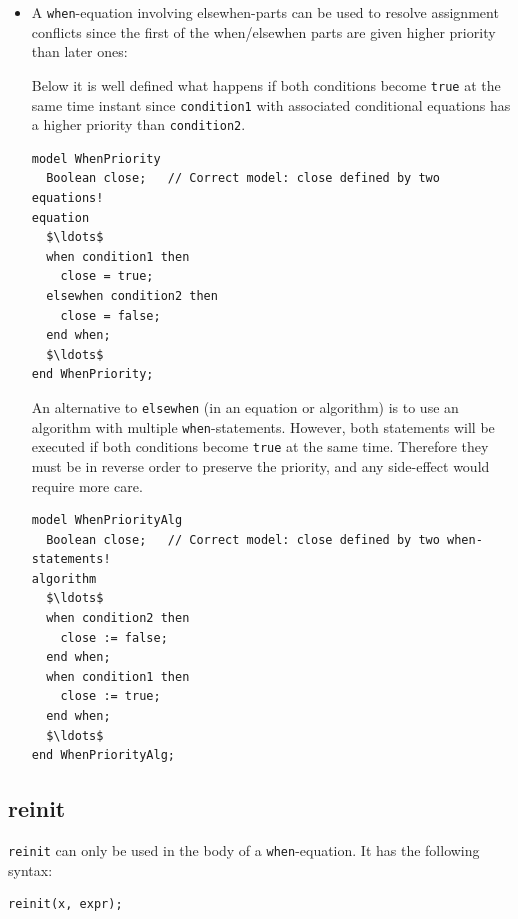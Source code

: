 \begin{itemize}
\item
  A \lstinline!when!-equation involving elsewhen-parts can be used to resolve assignment conflicts since the first of the when/elsewhen parts are given higher priority than later ones:
\begin{nonnormative}
Below it is well defined what happens if both conditions become \lstinline!true! at the same time instant since \lstinline!condition1! with associated conditional equations has a higher priority than \lstinline!condition2!.
\begin{lstlisting}[language=modelica]
model WhenPriority
  Boolean close;   // Correct model: close defined by two equations!
equation
  $\ldots$
  when condition1 then
    close = true;
  elsewhen condition2 then
    close = false;
  end when;
  $\ldots$
end WhenPriority;
\end{lstlisting}
An alternative to \lstinline!elsewhen! (in an equation or algorithm) is to use an algorithm with multiple \lstinline!when!-statements.
However, both statements will be executed if both conditions become \lstinline!true! at the same time.
Therefore they must be in reverse order to preserve the priority, and any side-effect would require more care.
\begin{lstlisting}[language=modelica]
model WhenPriorityAlg
  Boolean close;   // Correct model: close defined by two when-statements!
algorithm
  $\ldots$
  when condition2 then
    close := false;
  end when;
  when condition1 then
    close := true;
  end when;
  $\ldots$
end WhenPriorityAlg;
\end{lstlisting}
\end{nonnormative}
\end{itemize}


\subsection{reinit}\label{reinit}

\lstinline!reinit! can only be used in the body of a \lstinline!when!-equation.
It has the following syntax:
\begin{lstlisting}[language=modelica]
reinit(x, expr);
\end{lstlisting}

